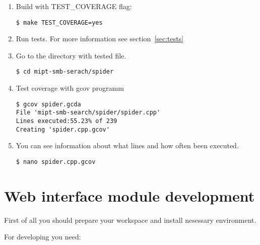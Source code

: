 \begin{enumerate}

\item Build with TEST\_COVERAGE flag:
\begin{lstlisting}
$ make TEST_COVERAGE=yes
\end{lstlisting}

\item Run tests. For more information see section~\ref{sec:tests}

\item Go to the directory with tested file.
\begin{lstlisting}
$ cd mipt-smb-serach/spider
\end{lstlisting}

\item Test coverage with gcov programm
\begin{lstlisting}
$ gcov spider.gcda
File 'mipt-smb-search/spider/spider.cpp'
Lines executed:55.23% of 239
Creating 'spider.cpp.gcov'
\end{lstlisting}

\item You can see information about what lines and how often been executed.
\begin{lstlisting}
$ nano spider.cpp.gcov
\end{lstlisting}

\end{enumerate}

\section{Web interface module development}

First of all you should prepare your workspace and install nesessary environment.

For developing you need:


